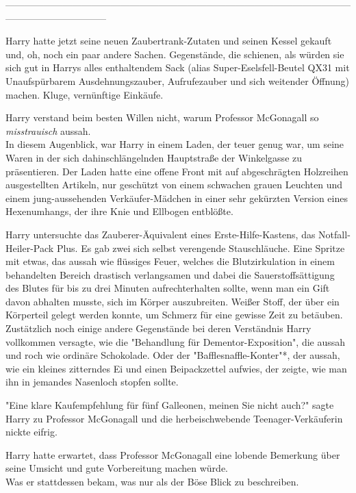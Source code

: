 {--------------------------------------------------------------------------------------------------------------------------------------------

Harry hatte jetzt seine neuen Zaubertrank-Zutaten und seinen Kessel gekauft und, oh, noch ein paar andere Sachen. Gegenstände, die schienen, als würden sie sich gut in Harrys alles enthaltendem Sack (alias Super-Eselsfell-Beutel QX31 mit Unaufspürbarem Ausdehnungszauber, Aufrufezauber und sich weitender Öffnung) machen. Kluge, vernünftige Einkäufe.

Harry verstand beim besten Willen nicht, warum Professor McGonagall so \emph{misstrauisch} aussah.\\ In diesem Augenblick, war Harry in einem Laden, der teuer genug war, um seine Waren in der sich dahinschlängelnden Hauptstraße der Winkelgasse zu präsentieren. Der Laden hatte eine offene Front mit auf abgeschrägten Holzreihen ausgestellten Artikeln, nur geschützt von einem schwachen grauen Leuchten und einem jung-aussehenden Verkäufer-Mädchen in einer sehr gekürzten Version eines Hexenumhangs, der ihre Knie und Ellbogen entblößte.

Harry untersuchte das Zauberer-Äquivalent eines Erste-Hilfe-Kastens, das Notfall-Heiler-Pack Plus. Es gab zwei sich selbst verengende Stauschläuche. Eine Spritze mit etwas, das aussah wie flüssiges Feuer, welches die Blutzirkulation in einem behandelten Bereich drastisch verlangsamen und dabei die Sauerstoffsättigung des Blutes für bis zu drei Minuten aufrechterhalten sollte, wenn man ein Gift davon abhalten musste, sich im Körper auszubreiten. Weißer Stoff, der über ein Körperteil gelegt werden konnte, um Schmerz für eine gewisse Zeit zu betäuben. Zustätzlich noch einige andere Gegenstände bei deren Verständnis Harry vollkommen versagte, wie die "Behandlung für Dementor-Exposition", die aussah und roch wie ordinäre Schokolade. Oder der "Bafflesnaffle-Konter"*, der aussah, wie ein kleines zitterndes Ei und einen Beipackzettel aufwies, der zeigte, wie man ihn in jemandes Nasenloch stopfen sollte.

"Eine klare Kaufempfehlung für fünf Galleonen, meinen Sie nicht auch?" sagte Harry zu Professor McGonagall und die herbeischwebende Teenager-Verkäuferin nickte eifrig.

Harry hatte erwartet, dass Professor McGonagall eine lobende Bemerkung über seine Umsicht und gute Vorbereitung machen würde.\\ Was er stattdessen bekam, was nur als der Böse Blick zu beschreiben.

}
